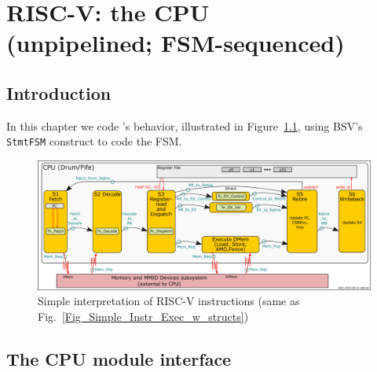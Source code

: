 

\chapter{RISC-V: the {\DRUM} CPU \\ (unpipelined; FSM-sequenced)}


\setcounter{page}{1}
\renewcommand{\thepage}{\arabic{chapter}-\arabic{page}}

\label{ch_Drum_code}


\section{Introduction}

In this chapter we code {\DRUM}'s behavior, illustrated in
Figure~\ref{Fig_Drum_Instr_Exec}, using BSV's \verb|StmtFSM|
construct to code the FSM.
\begin{figure}[htbp]
  \centerline{\includegraphics[width=6in,angle=0]{Figures/RSN_2025-09-01.000.00_FifeDrum_Stages_Multilayer_L1_L3}}
  \caption{\label{Fig_Drum_Instr_Exec}
           Simple interpretation of RISC-V instructions
	   (same as Fig.~\ref{Fig_Simple_Instr_Exec_w_structs})}
\end{figure}


\section{The {\DRUM} CPU module interface}

